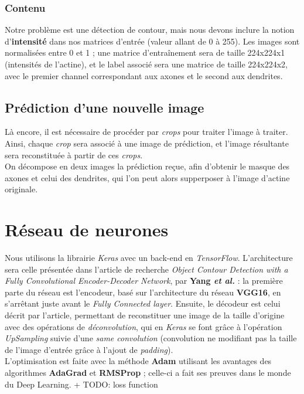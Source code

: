 \documentclass{report}
\begin{document}
\subsection{Contenu}

Notre problème est une détection de contour, mais nous devons inclure la notion
d'\textbf{intensité} dans nos matrices d'entrée (valeur allant de 0 à 255).
Les images sont normalisées entre 0 et 1 ; une matrice d'entraînement sera de
taille 224x224x1 (intensités de l'actine), et le label associé sera une matrice
de taille 224x224x2, avec le premier channel correspondant aux axones et le second
aux dendrites.

\section{Prédiction d'une nouvelle image}

Là encore, il est nécessaire de procéder par \textit{crops} pour traiter l'image
à traiter. Ainsi, chaque \textit{crop} sera associé à une image de prédiction,
et l'image résultante sera reconstituée à partir de ces \textit{crops}. \\
On décompose en deux images la prédiction reçue, afin d'obtenir le masque des axones
et celui des dendrites, qui l'on peut alors supperposer à l'image d'actine originale.


\chapter{Réseau de neurones}

Nous utilisons la librairie \textit{Keras} avec un back-end en \textit{TensorFlow}.
L'architecture sera celle présentée dans l'article de recherche \textit{Object Contour
Detection with a Fully Convolutional Encoder-Decoder Network}, par \textbf{Yang
\textit{et al.}} : la première parte du réseau est l'encodeur, basé sur l'architecture
du réseau \textbf{VGG16}, en s'arrêtant juste avant le \textit{Fully Connected layer}.
Ensuite, le décodeur est celui décrit par l'article, permettant de reconstituer
une image de la taille d'origine avec des opérations de \textit{déconvolution},
qui en \textit{Keras} se font grâce à l'opération \textit{UpSampling} suivie d'une
\textit{same convolution} (convolution ne modifiant pas la taille de l'image d'entrée
grâce à l'ajout de \textit{padding}). \\
L'optimisation est faite avec la méthode \textbf{Adam} utilisant les avantages des
algorithmes \textbf{AdaGrad} et \textbf{RMSProp}  ; celle-ci a fait ses preuves
dans le monde du Deep Learning.
+ TODO: loss function
\end{document}
